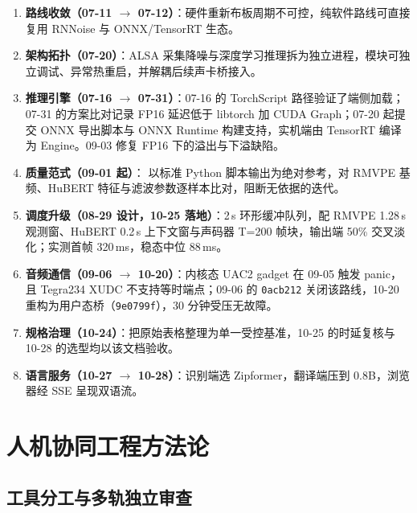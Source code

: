 \documentclass[11pt,a4paper]{ctexart}
\newcommand{\code}[1]{\texttt{#1}}
\newcommand{\p}[1]{\path{#1}}
\begin{document}
\begin{enumerate}[leftmargin=1.8em,itemsep=0.3em]
  \item \textbf{路线收敛（07-11 $\rightarrow$ 07-12）}：硬件重新布板周期不可控，纯软件路线可直接复用 RNNoise 与 ONNX/TensorRT 生态。
  \item \textbf{架构拓扑（07-20）}：ALSA 采集降噪与深度学习推理拆为独立进程，模块可独立调试、异常热重启，并解耦后续声卡桥接入。
  \item \textbf{推理引擎（07-16 $\rightarrow$ 07-31）}：07-16 的 TorchScript 路径验证了端侧加载；07-31 的方案比对记录 FP16 延迟低于 libtorch 加 CUDA Graph；07-20 起提交 ONNX 导出脚本与 ONNX Runtime 构建支持，实机端由 TensorRT 编译为 Engine。09-03 修复 FP16 下的溢出与下溢缺陷。
  \item \textbf{质量范式（09-01 起）}：\p{rvc-golden/} 以标准 Python 脚本输出为绝对参考，对 RMVPE 基频、HuBERT 特征与滤波参数逐样本比对，阻断无依据的迭代。
  \item \textbf{调度升级（08-29 设计，10-25 落地）}：2\,s 环形缓冲队列，配 RMVPE 1.28\,s 观测窗、HuBERT 0.2\,s 上下文窗与声码器 T=200 帧块，输出端 50\% 交叉淡化；实测首帧 320\,ms，稳态中位 88\,ms。
  \item \textbf{音频通信（09-06 $\rightarrow$ 10-20）}：内核态 UAC2 gadget 在 09-05 触发 panic，且 Tegra234 XUDC 不支持等时端点；09-06 的 \code{0acb212} 关闭该路线，10-20 重构为用户态桥（\code{9e0799f}），30 分钟受压无故障。
  \item \textbf{规格治理（10-24）}：把原始表格整理为单一受控基准，10-25 的时延复核与 10-28 的选型均以该文档验收。
  \item \textbf{语言服务（10-27 $\rightarrow$ 10-28）}：识别端选 Zipformer，翻译端压到 0.8B，浏览器经 SSE 呈现双语流。
\end{enumerate}

\section{人机协同工程方法论}

\subsection{工具分工与多轨独立审查}
\end{document}

